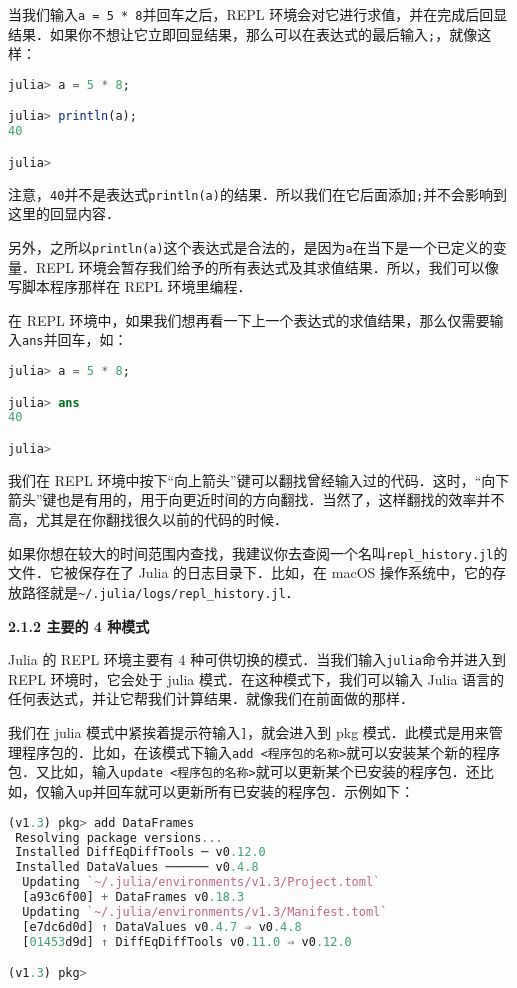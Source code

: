 当我们输入\verb|a = 5 * 8|并回车之后，REPL 环境会对它进行求值，并在完成后回显结果．如果你不想让它立即回显结果，那么可以在表达式的最后输入\verb|;|，就像这样：

\begin{lstlisting}[language=julia]
julia> a = 5 * 8;

julia> println(a);
40

julia> 
\end{lstlisting}

注意，\verb|40|并不是表达式\verb|println(a)|的结果．所以我们在它后面添加\verb|;|并不会影响到这里的回显内容．

另外，之所以\verb|println(a)|这个表达式是合法的，是因为\verb|a|在当下是一个已定义的变量．REPL 环境会暂存我们给予的所有表达式及其求值结果．所以，我们可以像写脚本程序那样在 REPL 环境里编程．

在 REPL 环境中，如果我们想再看一下上一个表达式的求值结果，那么仅需要输入\verb|ans|并回车，如：

\begin{lstlisting}[language=julia]
julia> a = 5 * 8;

julia> ans
40

julia> 
\end{lstlisting}

我们在 REPL 环境中按下“向上箭头”键可以翻找曾经输入过的代码．这时，“向下箭头”键也是有用的，用于向更近时间的方向翻找．当然了，这样翻找的效率并不高，尤其是在你翻找很久以前的代码的时候．

如果你想在较大的时间范围内查找，我建议你去查阅一个名叫\verb|repl_history.jl|的文件．它被保存在了 Julia 的日志目录下．比如，在 macOS 操作系统中，它的存放路径就是\verb|~/.julia/logs/repl_history.jl|．

\textbf{2.1.2 主要的 4 种模式}

Julia 的 REPL 环境主要有 4 种可供切换的模式．当我们输入\verb|julia|命令并进入到 REPL 环境时，它会处于 julia 模式．在这种模式下，我们可以输入 Julia 语言的任何表达式，并让它帮我们计算结果．就像我们在前面做的那样．

我们在 julia 模式中紧挨着提示符输入\verb|]|，就会进入到 pkg 模式．此模式是用来管理程序包的．比如，在该模式下输入\verb|add <程序包的名称>|就可以安装某个新的程序包．又比如，输入\verb|update <程序包的名称>|就可以更新某个已安装的程序包．还比如，仅输入\verb|up|并回车就可以更新所有已安装的程序包．示例如下：

\begin{lstlisting}[language=julia]
(v1.3) pkg> add DataFrames
 Resolving package versions...
 Installed DiffEqDiffTools ─ v0.12.0
 Installed DataValues ────── v0.4.8
  Updating `~/.julia/environments/v1.3/Project.toml`
  [a93c6f00] + DataFrames v0.18.3
  Updating `~/.julia/environments/v1.3/Manifest.toml`
  [e7dc6d0d] ↑ DataValues v0.4.7 ⇒ v0.4.8
  [01453d9d] ↑ DiffEqDiffTools v0.11.0 ⇒ v0.12.0

(v1.3) pkg> 
\end{lstlisting}

